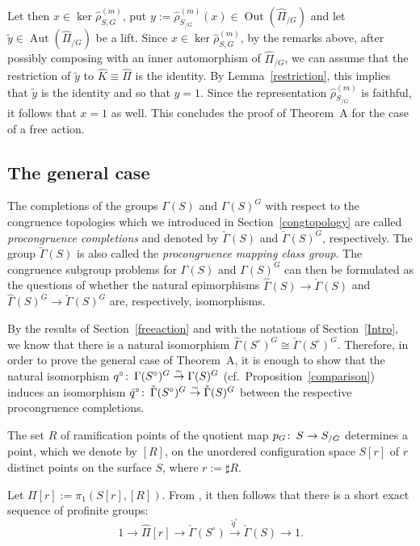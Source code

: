 \documentclass[12pt,twoside]{amsart}
\theoremstyle{definition}
\def\Aut{\operatorname{Aut}}
\def\Out{\operatorname{Out}}
\def\hP{{\widehat\Pi}}
\def\G{{\Gamma}}
\def\kG{{\check\Gamma}}
\def\hG{{\widehat\Gamma}}
\def\wh{\widehat}
\def\sr{\stackrel}
\def\co{\colon\thinspace}
\begin{document}
Let then $x\in\ker\hat\rho_{S,G}^{(m)}$, put $y:=\hat\rho_{S_{/G}}^{(m)}(x)\in\Out(\hP_{/G})$ and let $\tilde y\in\Aut(\hP_{/G})$ be a lift.
Since $x\in\ker\hat\rho_{S,G}^{(m)}$, by the remarks above, after possibly composing with an inner automorphism of $\hP_{/G}$, 
we can assume that the restriction of $\tilde y$ to $\wh{K}\equiv\hP$ is the identity. By Lemma~\ref{restriction}, this implies that $\tilde y$ 
is the identity and so that $y=1$. Since the representation $\hat\rho_{S_{/G}}^{(m)}$ is faithful, it follows that $x=1$ as well. 
This concludes the proof of Theorem~A for the case of a free action.


\subsection{The general case}
The completions of the groups $\G(S)$ and $\G(S)^G$ with respect to the congruence topologies which we introduced in Section~\ref{congtopology}
are called \emph{procongruence completions} and denoted by $\kG(S)$ and $\kG(S)^G$, respectively. The group $\kG(S)$ is also called the
\emph{procongruence mapping class group}. The congruence subgroup problems for $\G(S)$ and $\G(S)^G$ can then be formulated as the
questions of whether the natural epimorphisms  $\hG(S)\to\kG(S)$ and $\hG(S)^G\to\kG(S)^G$ are, respectively, isomorphisms.

By the results of Section~\ref{freeaction} and with the notations of Section~\ref{Intro}, we know that there is a natural isomorphism 
$\hG(S^\circ)^G\cong\kG(S^\circ)^G$. Therefore, in order to prove the general case of Theorem~A, it is enough to show that the 
natural isomorphism $q^\circ\co\G(S^\circ)^G\sr{\sim}{\to}\G(S)^G$ (cf.\ Proposition~\ref{comparison})
induces an isomorphism $\check{q}^\circ\co\kG(S^\circ)^G\sr{\sim}{\to}\kG(S)^G$ between the respective procongruence completions.

The set $R$ of ramification points of the quotient map $p_G\co S\to S_{/G}$ determines a point, which we denote by $[R]$, 
on the unordered configuration space $S[r]$ of $r$ distinct points on the surface $S$, where $r:=\sharp R$. 

Let $\Pi[r]:=\pi_1(S[r],[R])$. From \cite[Corollary~4.7 and Proposition~4.9]{CongTop}, 
it then follows that there is a short exact sequence of profinite groups:
\begin{equation}\label{Birman}
1\to\hP[r]\to\kG(S^\circ)\sr{\check{q}^\circ}{\to}\kG(S)\to 1.
\end{equation}
\end{document}
